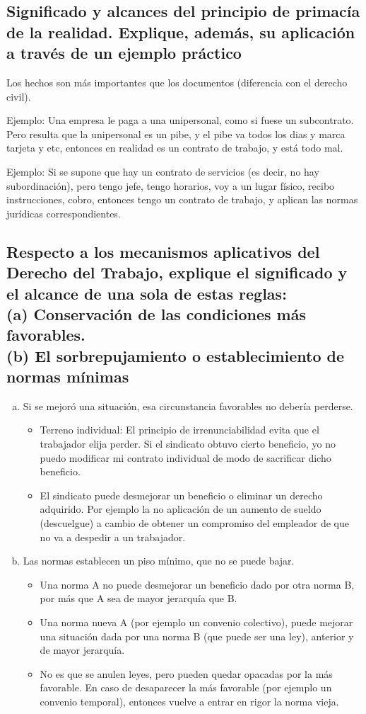 \documentclass[spanish,12pt,a4paper,titlepage]{report}
\begin{document}
\subsection{Significado y alcances del principio de primacía de la realidad. Explique, además, su aplicación a través de \textbf{un} ejemplo práctico}

Los hechos son más importantes que los documentos (diferencia con el derecho civil).

Ejemplo: Una empresa le paga a una unipersonal, como si fuese un subcontrato. Pero resulta que la unipersonal es un pibe, y el pibe va todos los dias y marca tarjeta y etc, entonces en realidad es un contrato de trabajo, y está todo mal.

Ejemplo: Si se supone que hay un contrato de servicios (es decir, no hay subordinación), pero tengo jefe, tengo horarios, voy a un lugar físico, recibo instrucciones, cobro, entonces tengo un contrato de trabajo, y aplican las normas jurídicas correspondientes.

\subsection{Respecto a los mecanismos aplicativos del Derecho del Trabajo, explique el significado y el alcance de \textbf{una sola} de estas reglas:\\(a) Conservación de las condiciones más favorables.\\(b) El sorbrepujamiento o establecimiento de normas mínimas }

\begin{enumerate}[(a)]
\item Si se mejoró una situación, esa circunstancia favorables no debería perderse.
  \begin{itemize}
  \item Terreno individual: El principio de irrenunciabilidad evita que el trabajador elija perder. Si el sindicato obtuvo cierto beneficio, yo no puedo modificar mi contrato individual de modo de sacrificar dicho beneficio.
  \item El sindicato puede desmejorar un beneficio o eliminar un derecho adquirido. Por ejemplo la no aplicación de un aumento de sueldo (descuelgue) a cambio de obtener un compromiso del empleador de que no va a despedir a un trabajador.
  \end{itemize}
\item Las normas establecen un piso mínimo, que no se puede bajar.
  \begin{itemize}
  \item Una norma A no puede desmejorar un beneficio dado por otra norma B, por más que A sea de mayor jerarquía que B.
  \item Una norma nueva A (por ejemplo un convenio colectivo), puede mejorar una situación dada por una norma B (que puede ser una ley), anterior y de mayor jerarquía.
  \item No es que se anulen leyes, pero pueden quedar opacadas por la más favorable. En caso de desaparecer la más favorable (por ejemplo un convenio temporal), entonces vuelve a entrar en rigor la norma vieja.
  \end{itemize}
\end{enumerate}
\end{document}
